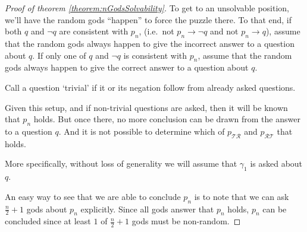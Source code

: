 \documentclass[10pt,a4paper]{amsart}
\begin{document}
\begin{proof}[Proof of theorem \ref{theorem:nGodsSolvability}]
To get to an unsolvable position, we'll have the random gods ``happen''
to force the puzzle there. To that end,
if both $q$ and $\neg q$ are consistent with $p_n$,
(i.e.\ not $p_n\!\rightarrow\!\neg q$ and not $p_n\!\rightarrow\!q$),
assume that the random gods always happen to give the incorrect answer
to a question about $q$.
If only one of $q$ and $\neg q$ is consistent with $p_n$,
assume that the random gods always happen to give the correct answer 
to a question about $q$.


Call a question `trivial' if it or its negation follow from already
asked questions.

Given this setup,
and if non-trivial questions are asked,
then it will be known that $p_n$ holds.
But once there,
no more conclusion can be drawn from the answer to a question $q$.
And it is not possible to determine which of 
$p_{\mathcal{\scriptscriptstyle T}\mathcal{\scriptscriptstyle R}}$ and
$p_{\mathcal{\scriptscriptstyle R}\mathcal{\scriptscriptstyle T}}$
that holds.

More specifically, without loss of generality we will assume that $\gamma_1$ is asked about $q$. 


An easy way to see that we 
are able to
conclude $p_n$ is to note that we can ask
$\frac{n}{2}+1$ gods
about $p_n$ explicitly.
Since all gods answer that $p_n$ holds, $p_n$ can be concluded since at least
$1$ of $\frac{n}{2}+1$ gods must be non-random.


\end{proof}
\end{document}
